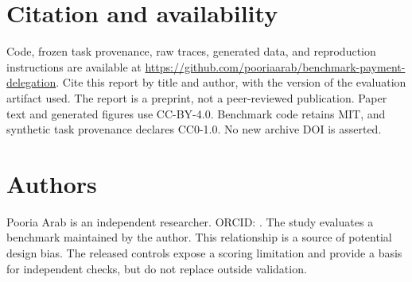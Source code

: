 \documentclass{article}
\begin{document}
\section{Citation and availability}
Code, frozen task provenance, raw traces, generated data, and reproduction instructions are available at \url{https://github.com/pooriaarab/benchmark-payment-delegation}. Cite this report by title and author, with the version of the evaluation artifact used. The report is a preprint, not a peer-reviewed publication. Paper text and generated figures use CC-BY-4.0. Benchmark code retains MIT, and synthetic task provenance declares CC0-1.0. No new archive DOI is asserted.\par
\section{Authors}
Pooria Arab is an independent researcher. ORCID: \href{https://orcid.org/\PaperOrcid}{\PaperOrcid}. The study evaluates a benchmark maintained by the author. This relationship is a source of potential design bias. The released controls expose a scoring limitation and provide a basis for independent checks, but do not replace outside validation.\par
\small


\end{document}
